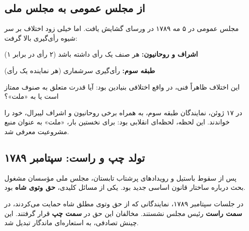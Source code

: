 \subsection{از مجلس عمومی به مجلس ملی}

مجلس عمومی در ۵ مه ۱۷۸۹ در ورسای گشایش یافت. اما خیلی زود اختلاف بر سر شیوه رأی‌گیری بالا گرفت:

\begin{debatebox}
\textbf{اشراف و روحانیون:} هر صنف یک رأی داشته باشد (۲ رأی در برابر ۱)

\textbf{طبقه سوم:} رأی‌گیری سرشماری (هر نماینده یک رأی)

این اختلاف ظاهراً فنی، در واقع اختلافی بنیادین بود: آیا قدرت متعلق به صنوف ممتاز است یا به «ملت»؟
\end{debatebox}

در ۱۷ ژوئن، نمایندگان طبقه سوم، به همراه برخی روحانیون و اشراف لیبرال، خود را  خواندند. این لحظه، لحظه‌ای انقلابی بود: برای نخستین بار، «ملت» به عنوان منبع مشروعیت معرفی شد.

\subsection{تولد چپ و راست: سپتامبر ۱۷۸۹}

پس از سقوط باستیل و رویدادهای پرشتاب تابستان، مجلس ملی مؤسسان مشغول بحث درباره ساختار قانون اساسی جدید بود. یکی از مسائل کلیدی، \textbf{حق وتوی شاه} بود.

\begin{historybox}
در جلسات سپتامبر ۱۷۸۹، نمایندگانی که از حق وتوی مطلق شاه حمایت می‌کردند، در \textbf{سمت راست} رئیس مجلس نشستند. مخالفان این حق در \textbf{سمت چپ} قرار گرفتند. این چینش تصادفی، به استعاره‌ای ماندگار تبدیل شد.
\end{historybox}

